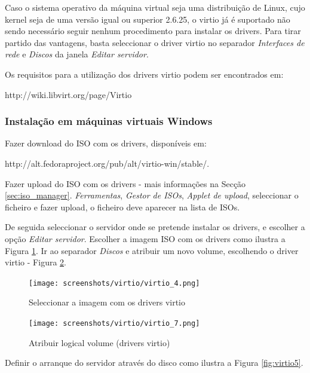 Caso o sistema operativo da máquina virtual seja uma distribuição de Linux, cujo kernel seja de uma versão igual ou superior 2.6.25, o virtio já é suportado não sendo necessário seguir nenhum procedimento para instalar os drivers. Para tirar partido das vantagens, basta seleccionar o driver virtio no separador \textit{Interfaces de rede} e \textit{Discos} da janela \textit{Editar servidor}.

Os requisitos para a utilização dos drivers virtio podem ser encontrados em: 

http://wiki.libvirt.org/page/Virtio

\subsubsection*{Instalação em máquinas virtuais Windows}

Fazer download do ISO com os drivers, disponíveis em:

http://alt.fedoraproject.org/pub/alt/virtio-win/stable/.

Fazer upload do ISO com os drivers - mais informações na Secção \ref{sec:iso_manager}. \textit{Ferramentas}, \textit{Gestor de ISOs}, \textit{Applet de upload}, seleccionar o ficheiro e fazer upload, o ficheiro deve aparecer na lista de ISOs.

De seguida seleccionar o servidor onde se pretende instalar os drivers, e escolher a opção \textit{Editar servidor}. Escolher a imagem ISO com os drivers como ilustra a Figura \ref{fig:virtio4}. Ir ao separador \textit{Discos} e atribuir um novo volume, escolhendo o driver virtio - Figura \ref{fig:virtio7}.

\begin{figure}[H]
	\begin{center}
	\texttt{[image: screenshots/virtio/virtio\_4.png]}
	\caption{Seleccionar a imagem com os drivers virtio}
	\label{fig:virtio4}
	\end{center}
\end{figure}

\begin{figure}[H]
	\begin{center}
	\texttt{[image: screenshots/virtio/virtio\_7.png]}
	\caption{Atribuir logical volume (drivers virtio)}
	\label{fig:virtio7}
	\end{center}
\end{figure}

Definir o arranque do servidor através do disco como ilustra a Figura \ref{fig:virtio5}.

